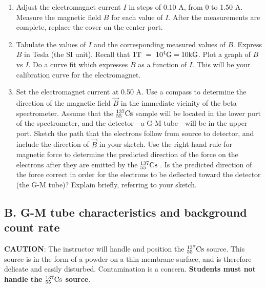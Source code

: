 \documentclass{article}
\newcommand{\cs}{${}^{137}_{55}{\rm Cs}$ }
\begin{document}
\begin{enumerate}
\item Adjust the electromagnet current $I$ in steps of 0.10 A, from 0 to
1.50 A.  Measure the magnetic field $B$ for each value of $I$.  After the
measurements are complete, replace the cover on the center port.

\item Tabulate the values of $I$ and the corresponding measured
values of $B$.  Express $B$ in Tesla (the SI unit).  Recall that 
$1 {\rm T } ~=~ 10^4 {\rm G} = 10 {\rm kG}$.  Plot a graph of $B$
vs $I$.  Do a curve fit which expresses $B$ as a function of $I$.  This
will be your calibration curve for the electromagnet.

\item Set the electromagnet current at 0.50 A.  Use a compass
to determine the direction of the magnetic field
$\vec{B}$ in the immediate vicinity of the beta
spectrometer.  Assume that the \cs sample will be located in the
lower port of the spectrometer, and the detector---a G-M tube---will 
be in the upper port.  Sketch the path that the electrons follow
from source to detector, and include the direction of
$\vec{B}$ in your sketch.  Use the right-hand rule
for magnetic force to determine the predicted direction of the force on
the electrons after they are emitted by the \cs.  Is the predicted
direction of the force correct in order for
the electrons to be deflected toward the detector (the G-M tube)?
Explain briefly, referring to your sketch.

\end{enumerate}

\subsection{B.  G-M tube characteristics and background count rate}

{\bf CAUTION}: The instructor will handle and
position the \cs source.  This source is in the form of a powder on
a thin membrane surface, and is therefore delicate and easily
disturbed.  Contamination is a concern.  {\bf Students must not handle the
\cs source}.
\end{document}
